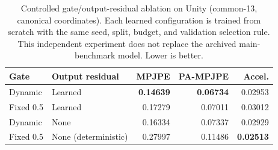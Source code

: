 \begin{table}[htbp]
\centering
\caption{Controlled gate/output-residual ablation on Unity (common-13, canonical coordinates). Each learned configuration is trained from scratch with the same seed, split, budget, and validation selection rule. This independent experiment does not replace the archived main-benchmark model. Lower is better.}
\label{tab:gate_retraining}
\small
\setlength{\tabcolsep}{5pt}
\begin{tabular}{llrrr}
\toprule
Gate & Output residual & MPJPE & PA-MPJPE & Accel. \\
\midrule
Dynamic & Learned & \textbf{0.14639} & \textbf{0.06734} & 0.02953 \\
Fixed 0.5 & Learned & 0.17279 & 0.07011 & 0.03012 \\
Dynamic & None & 0.16334 & 0.07337 & 0.02929 \\
Fixed 0.5 & None (deterministic) & 0.27997 & 0.11486 & \textbf{0.02513} \\
\bottomrule
\end{tabular}
\end{table}
